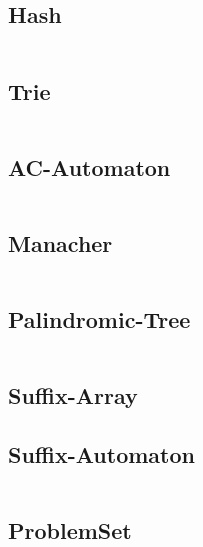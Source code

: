 \documentclass[a4paper,12pt]{article}
\begin{document}
\subsection{Hash}
\inputminted[]{c++}{Template/String/hash.cpp}
\subsection{Trie}
\inputminted[]{c++}{Template/String/trie.cpp}
\subsection{AC-Automaton}
\inputminted[]{c++}{Template/String/acm.cpp}
\subsection{Manacher}
\inputminted[]{c++}{Template/String/manacher.cpp}
\subsection{Palindromic-Tree}
\inputminted[]{c++}{Template/String/pt.cpp}
\subsection{Suffix-Array}
\subsection{Suffix-Automaton}
\inputminted[]{c++}{Template/String/sam.cpp}
\subsection{ProblemSet}
\end{document}
